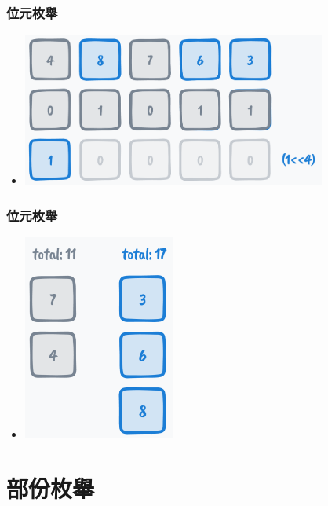 \documentclass{beamer}
\begin{document}
\begin{frame}
    \frametitle{位元枚舉}
    \begin{itemize}
        \item \includegraphics[width=10.0cm]{img/img_9.png}
    \end{itemize}
\end{frame}

\begin{frame}
    \frametitle{位元枚舉}
    \begin{itemize}
        \item \includegraphics[width=5.0cm]{img/img_10.png}
    \end{itemize}
\end{frame}

\section{部份枚舉}
\end{document}
